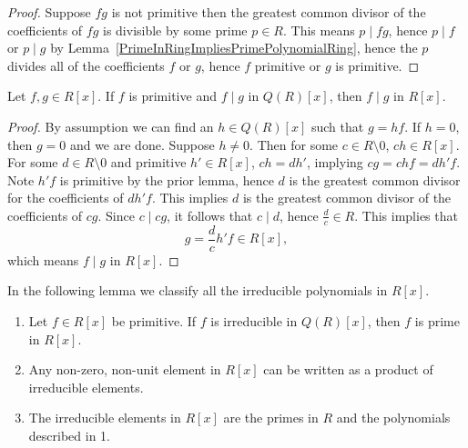 \begin{proof}
    Suppose $fg$ is not primitive then the greatest common divisor of the coefficients of $fg$ is divisible by some prime $p\in R$. This means $p\mid fg$, hence $p\mid f$ or $p\mid g$ by Lemma~\ref{PrimeInRingImpliesPrimePolynomialRing}, hence the $p$ divides all of the coefficients $f$ or $g$, hence $f$ primitive or $g$ is primitive. 
\end{proof}
\begin{lemma}\label{PrimitivePolynomialOverFractionFieldDivisorImpliesDivisorInBaseRing}
    Let $f,g\in R[x]$. If $f$ is primitive and $f\mid g$ in $Q(R)[x]$, then $f\mid g$ in $R[x]$.
\end{lemma}
\begin{proof}
    By assumption we can find an $h\in Q(R)[x]$ such that $g = hf$. If $h=0$, then $g=0$ and we are done. Suppose $h\neq 0$. Then for some $c\in R\setminus 0$, $ch\in R[x]$. For some $d\in R\setminus 0$ and primitive $h'\in R[x]$, $ch=dh'$, implying $cg = chf=dh'f$. Note $h'f$ is primitive by the prior lemma, hence $d$ is the greatest common divisor for the coefficients of $dh'f$. This implies $d$ is the greatest common divisor of the coefficients of $cg$. Since $c\mid cg$, it follows that $c\mid d$, hence $\frac{d}{c}\in R$. This implies that                                     $$g = \frac{d}{c}h'f\in R[x],$$                               
    which means $f\mid g$ in $R[x]$.
\end{proof}
In the following lemma we classify all the irreducible polynomials in $R[x]$.
\begin{lemma}\label{ClassificationOfIrreducibles}
    \begin{enumerate}
        \item Let $f\in R[x]$ be primitive. If $f$ is irreducible in $Q(R)[x]$, then $f$ is prime in $R[x]$. 
        \item Any non-zero, non-unit element in $R[x]$ can be written as a product of irreducible elements. 
        \item The irreducible elements in $R[x]$ are the primes in $R$ and the polynomials described in 1.
    \end{enumerate}
\end{lemma}
